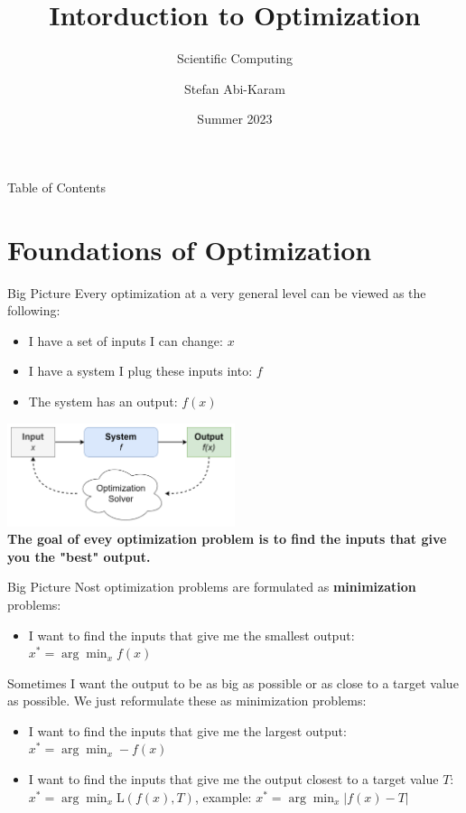 \documentclass[aspectratio=169]{beamer}
\title{Intorduction to Optimization}
\subtitle{Scientific Computing}
\author{Stefan Abi-Karam}
\date{Summer 2023}
\begin{document}
\begin{frame}
    \titlepage
\end{frame}

\begin{frame}{Table of Contents}
    \tableofcontents
\end{frame}

\section{Foundations of Optimization}

\begin{frame}{Big Picture}
    Every optimization at a very general level can be viewed as the following:
    \begin{itemize}
        \item I have a set of inputs I can change: $x$
        \item I have a system I plug these inputs into: $f$
        \item The system has an output: $f(x)$
    \end{itemize}

    \vspace{\baselineskip}

    \begin{center}
        \includegraphics[width=0.5\textwidth]{./imgs/opt_system.png}\\
        \textbf{The goal of evey optimization problem is to find the inputs that give you the "best" output.}
    \end{center}
\end{frame}

\begin{frame}{Big Picture}
    Nost optimization problems are formulated as \textbf{minimization} problems:
    \begin{itemize}
        \item I want to find the inputs that give me the smallest output: $x^* = \arg\min_x f(x)$
    \end{itemize}

    \vspace{\baselineskip}

    Sometimes I want the output to be as big as possible or as close to a target value as possible. We just reformulate these as minimization problems:
    \begin{itemize}
        \item I want to find the inputs that give me the largest output: $x^* = \arg\min_x -f(x)$
        \item I want to find the inputs that give me the output closest to a target value $T$: $x^* = \arg\min_x \mathrm{L}(f(x), T)$, example: $x^* = \arg\min_x |f(x) - T|$
    \end{itemize}
\end{frame}
\end{document}
